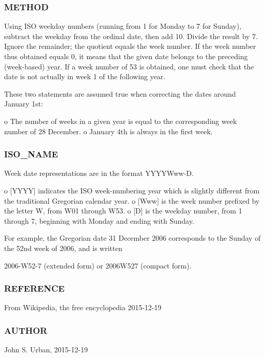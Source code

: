\subsubsection*{M\+E\+T\+H\+OD}

Using I\+SO weekday numbers (running from 1 for Monday to 7 for Sunday), subtract the weekday from the ordinal date, then add 10. Divide the result by 7. Ignore the remainder; the quotient equals the week number. If the week number thus obtained equals 0, it means that the given date belongs to the preceding (week-\/based) year. If a week number of 53 is obtained, one must check that the date is not actually in week 1 of the following year.

These two statements are assumed true when correcting the dates around January 1st\+:

o The number of weeks in a given year is equal to the corresponding week number of 28 December. o January 4th is always in the first week.

\subsubsection*{I\+S\+O\+\_\+\+N\+A\+ME}

Week date representations are in the format Y\+Y\+Y\+Y\+Www-\/D.

o \mbox{[}Y\+Y\+YY\mbox{]} indicates the I\+SO week-\/numbering year which is slightly different from the traditional Gregorian calendar year. o \mbox{[}Www\mbox{]} is the week number prefixed by the letter W, from W01 through W53. o \mbox{[}D\mbox{]} is the weekday number, from 1 through 7, beginning with Monday and ending with Sunday.

For example, the Gregorian date 31 December 2006 corresponds to the Sunday of the 52nd week of 2006, and is written

2006-\/\+W52-\/7 (extended form) or 2006\+W527 (compact form).

\subsubsection*{R\+E\+F\+E\+R\+E\+N\+CE}

From Wikipedia, the free encyclopedia 2015-\/12-\/19

\subsubsection*{A\+U\+T\+H\+OR}

John S. Urban, 2015-\/12-\/19 

